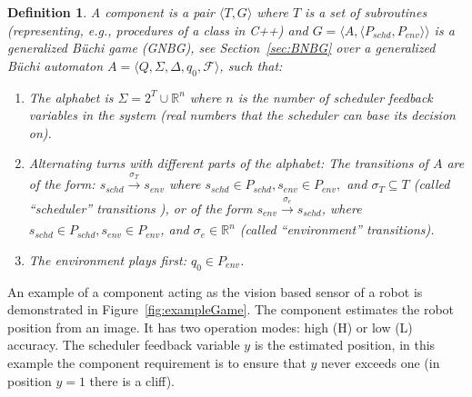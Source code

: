 \documentclass[ twoside, 12pt ]{article}
\newcommand\R{{\mathbb R}}
\newtheorem{dfn}{Definition} %
\begin{document}
\begin{dfn}
    A component is a pair $\langle T,G\rangle$ where $T$ is a set of subroutines (representing, e.g., procedures of a class in C++) and $G=\langle A,\langle P_{schd}, P_{env}\rangle \rangle$ is a generalized B{\"u}chi game (GNBG), see Section~\ref{sec:BNBG} over a generalized B{\"u}chi automaton $A= \langle Q,\Sigma,\Delta,q_0,\mathcal{F} \rangle $, such that:
    \begin{enumerate}
        \item The \textit{alphabet} is $\Sigma = 2^{T} \cup \R^n$ where $n$ is the number of scheduler feedback variables in the system (real numbers that the scheduler can base its decision on).
        \item 
        Alternating turns with different parts of the alphabet:
       	The transitions of $A$ are of the form: $s_{schd} \xrightarrow[]{\sigma_{T}} s_{env}$ where $s_{schd} \in P_{schd}, s_{env} \in P_{env},$ and $\sigma_{T} \subseteq T$ (called  ``scheduler'' transitions ),  or of the form $s_{env} \xrightarrow[]{\sigma_{e}} s_{schd}$, where $s_{schd} \in P_{schd}, s_{env} \in P_{env}$, and $\sigma_{e} \in \R^n$ (called ``environment'' transitions).
        \item The environment plays first: $q_0 \in P_{env}$.
    \end{enumerate}
\end{dfn}








An example of a component acting as the vision based sensor of a robot is demonstrated in Figure~\ref{fig:exampleGame}. 
The component estimates the robot position from an image. It has two operation modes: high (H) or low (L) accuracy.
The scheduler feedback variable $y$ is the estimated position, in this example the component requirement is to ensure that $y$ never exceeds one (in position $y=1$ there is a cliff). 
\end{document}
